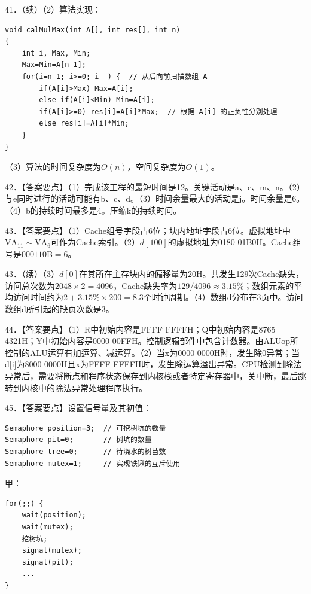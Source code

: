 \documentclass[UTF8,11pt]{ctexart}
\begin{document}
41．（续）（2）算法实现：


\begin{Verbatim}[breaklines,breakanywhere,fontsize=\small]
void calMulMax(int A[], int res[], int n)
{
    int i, Max, Min;
    Max=Min=A[n-1];
    for(i=n-1; i>=0; i--) {  // 从后向前扫描数组 A
        if(A[i]>Max) Max=A[i];
        else if(A[i]<Min) Min=A[i];
        if(A[i]>=0) res[i]=A[i]*Max;  // 根据 A[i] 的正负性分别处理
        else res[i]=A[i]*Min;
    }
}
\end{Verbatim}

（3）算法的时间复杂度为\(\displaystyle O(n)\)，空间复杂度为\(\displaystyle O(1)\)。


42．【答案要点】（1）完成该工程的最短时间是12。关键活动是a、e、m、n。（2）与e同时进行的活动可能有b、c、d。（3）时间余量最大的活动是j。时间余量是6。（4）b的持续时间最多是4。压缩k的持续时间。


43．【答案要点】（1）Cache组号字段占6位；块内地址字段占6位。虚拟地址中\(\displaystyle \mathrm{VA}_{11}\sim\mathrm{VA}_{6}\)可作为Cache索引。（2）\(\displaystyle d[100]\)的虚拟地址为0180 01B0H。Cache组号是\(\displaystyle 000110\mathrm{B}=6\)。


43．（续）（3）\(\displaystyle d[0]\)在其所在主存块内的偏移量为20H。共发生129次Cache缺失，访问总次数为\(\displaystyle 2048\times2=4096\)，Cache缺失率为\(\displaystyle 129/4096\approx3.15\%\)；数组元素的平均访问时间约为\(\displaystyle 2+3.15\%\times200=8.3\)个时钟周期。（4）数组d分布在3页中。访问数组d所引起的缺页次数是3。


44．【答案要点】（1）R中初始内容是FFFF FFFFH；Q中初始内容是8765 4321H；Y中初始内容是0000 00FFH。控制逻辑部件中包含计数器。由ALUop所控制的ALU运算有加运算、减运算。（2）当x为0000 0000H时，发生除0异常；当d[i]为8000 0000H且x为FFFF FFFFH时，发生除运算溢出异常。CPU检测到除法异常后，需要将断点和程序状态保存到内核栈或者特定寄存器中，关中断，最后跳转到内核中的除法异常处理程序执行。


45．【答案要点】设置信号量及其初值：


\begin{Verbatim}[breaklines,breakanywhere,fontsize=\small]
Semaphore position=3;  // 可挖树坑的数量
Semaphore pit=0;       // 树坑的数量
Semaphore tree=0;      // 待浇水的树苗数
Semaphore mutex=1;     // 实现铁锹的互斥使用
\end{Verbatim}

甲：


\begin{Verbatim}[breaklines,breakanywhere,fontsize=\small]
for(;;) {
    wait(position);
    wait(mutex);
    挖树坑;
    signal(mutex);
    signal(pit);
    ...
}
\end{Verbatim}
\end{document}
